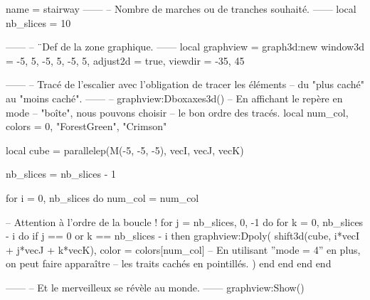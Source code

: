 \documentclass{standalone}
\begin{document}
\begin{luadraw}{name = stairway}
------
-- Nombre de marches ou de tranches souhaité.
------
local nb_slices = 10

------
-- ¨Def de la zone graphique.
------
local graphview = graph3d:new{
  window3d = {-5, 5, -5, 5, -5, 5},
  adjust2d = true,
  viewdir  = {-35, 45}
}

------
-- Tracé de l'escalier avec l'obligation de tracer les éléments
-- du "plus caché" au "moins caché".
------
-- graphview:Dboxaxes3d()  -- En affichant le repère en mode
                        -- "boîte", nous pouvons choisir
                        -- le bon ordre des tracés.
local num_col, colors = 0, {"ForestGreen", "Crimson"}

local cube = parallelep(M(-5, -5, -5), vecI, vecJ, vecK)

nb_slices = nb_slices - 1

for i = 0, nb_slices do
  num_col = num_col%

-- Attention à l'ordre de la boucle !
  for j = nb_slices, 0, -1 do
    for k = 0, nb_slices - i do
      if j == 0 or k == nb_slices - i then
        graphview:Dpoly(
          shift3d(cube, i*vecI + j*vecJ + k*vecK),
          {
            color = colors[num_col]
-- En utilisant ''mode = 4'' en plus, on peut faire apparaître
-- les traits cachés en pointillés.
          })
      end
    end
  end
end

------
-- Et le merveilleux se révèle au monde.
------
graphview:Show()
\end{luadraw}
\end{document}
